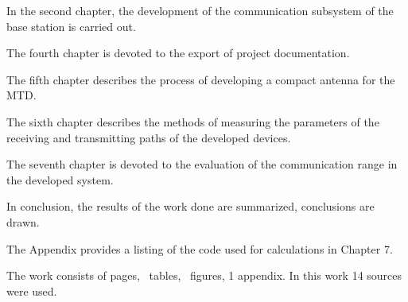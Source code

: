 In the second chapter, the development of the communication subsystem of the base station is carried out.

The fourth chapter is devoted to the export of project documentation.

The fifth chapter describes the process of developing a compact antenna for the MTD.

The sixth chapter describes the methods of measuring the parameters of the receiving and transmitting paths of the developed devices.

The seventh chapter is devoted to the evaluation of the communication range in the developed system.

In conclusion, the results of the work done are summarized, conclusions are drawn.

The Appendix provides a listing of the code used for calculations in Chapter 7.

The work consists of \pageref*{LastPage} pages, \totaltables\ tables, \totalfigures\  figures, 1 appendix. In this work 14 sources were used.
